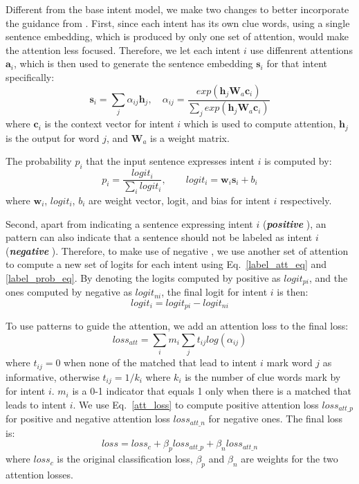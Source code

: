 Different from the base intent model, we make two changes to better incorporate the guidance from \RE.
First, since each intent has its own clue words, using a single sentence embedding, which is produced by only one set of attention, would make the attention less focused.
Therefore, we let each intent $i$ use diffenrent attentions $\textbf{a}_i$, which is then used to generate the sentence embedding $\textbf{s}_i$ for that intent specifically:
\begin{equation}
\textbf{s}_i = \sum_{j}{\alpha_{ij}\textbf{h}_j}, \quad
\alpha_{ij}=\frac{exp(\textbf{h}_j\textbf{W}_a\textbf{c}_i)}{\sum_{j}{exp(\textbf{h}_j\textbf{W}_a\textbf{c}_i)}}
\label{label_att_eq}
\end{equation}
where $\textbf{c}_i$ is the context vector for intent $i$ which is used to compute attention, $\textbf{h}_j$ is the \BLSTM output for word $j$, and $\textbf{W}_a$ is a weight matrix.

The probability $p_i$ that the input sentence expresses intent $i$ is computed by:
\begin{equation}
p_i = \frac{logit_i}{\sum_{i}{logit_i}}, \quad\quad logit_i=\textbf{w}_i\textbf{s}_i + b_i
\label{label_prob_eq}
\end{equation}
where $\textbf{w}_i$, $logit_i$, $b_i$ are weight vector, logit, and bias for intent $i$ respectively.

Second, apart from indicating a sentence expressing intent $i$ (\textbf{\emph{positive \REs}}), an \RE pattern can also indicate that a sentence should not be labeled as intent $i$ (\textbf{\emph{negative \REs}}). Therefore, to make use of negative \REs, we use another set of attention to compute a new set of logits for each intent using Eq.~\ref{label_att_eq} and \ref{label_prob_eq}. By denoting the logits computed by positive \REs as $logit_{pi}$, and the ones computed by negative \REs as $logit_{ni}$, the final logit for intent $i$ is then:
\begin{equation}
logit_i = logit_{pi} - logit_{ni}
\end{equation}

To use \RE patterns to guide the attention, we add an attention loss to the final loss:
\begin{equation}
loss_{att} = \sum_{i}{m_i\sum_{j}{t_{ij}log(\alpha_{ij})}}
\label{att_loss}
\end{equation}
where $t_{ij} = 0$ when none of the matched \REs that lead to intent $i$ mark word $j$ as informative, otherwise $t_{ij} = 1/k_{i}$ where $k_i$ is the number of clue words mark by \RE for intent $i$. $m_i$ is a 0-1 indicator that equals 1 only when there is a matched \RE that leads to intent $i$. We use Eq.~\ref{att_loss} to compute positive attention loss $loss_{att\_p}$ for positive \REs and negative attention loss $loss_{att\_n}$ for negative ones. The final loss is:
\begin{equation}
loss = loss_{c} + \beta_p loss_{att\_p} + \beta_n loss_{att\_n}
\end{equation}
where $loss_{c}$ is the original classification loss, $\beta_p$ and $\beta_n$ are weights for the two attention losses.

